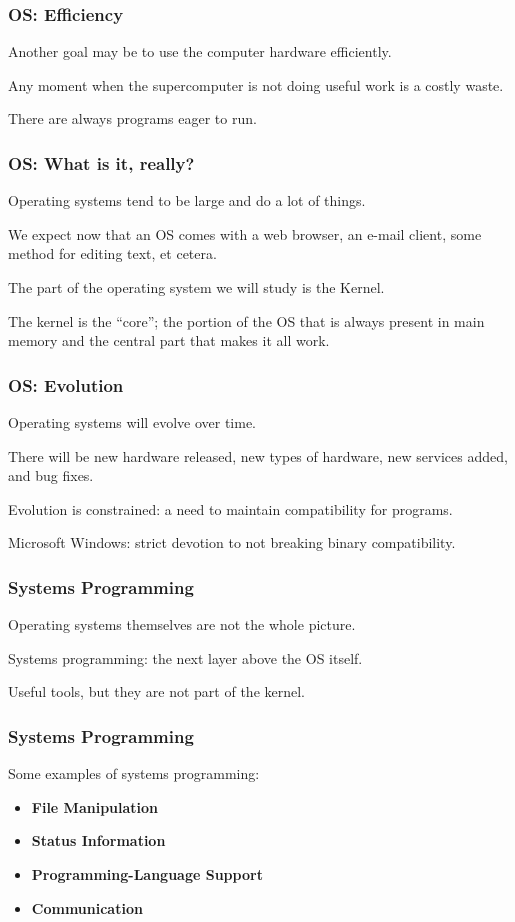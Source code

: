 \begin{frame}
\frametitle{OS: Efficiency}
Another goal may be to use the computer hardware efficiently.

Any moment when the supercomputer is not doing useful work is a costly waste.

There are always programs eager to run.

\end{frame}

\begin{frame}
\frametitle{OS: What is it, really?}

Operating systems tend to be large and do a lot of things. 

We expect now that an OS comes with a web browser, an e-mail client, some method for editing text, et cetera. 

The part of the operating system we will study is the \alert{Kernel}.

The kernel is the ``core''; the portion of the OS that is always present in main memory and the central part that makes it all work.

\end{frame}

\begin{frame}
\frametitle{OS: Evolution}
Operating systems will evolve over time. 

There will be new hardware released, new types of hardware, new services added, and bug fixes. 

Evolution is constrained: a need to maintain compatibility for programs. 

Microsoft Windows: strict devotion to not breaking binary compatibility.

\end{frame}

\begin{frame}
\frametitle{Systems Programming}
Operating systems themselves are not the whole picture.

Systems programming: the next layer above the OS itself.

Useful tools, but they are not part of the kernel. 

\end{frame}

\begin{frame}
\frametitle{Systems Programming}

Some examples of systems programming:

\begin{itemize}
	\item \textbf{File Manipulation}
	\item \textbf{Status Information}
	\item \textbf{Programming-Language Support}
	\item \textbf{Communication}
\end{itemize}

\end{frame}

